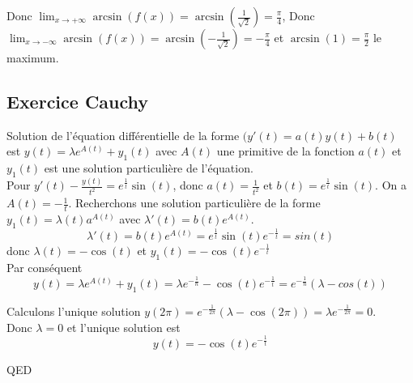 \documentclass[]{book}
\theoremstyle{definition}
\begin{document}
Donc $\lim_{x\to+\infty} \arcsin(f(x)) = \arcsin(\frac{1}{\sqrt{2}}) = \frac{\pi}{4}$, Donc $\lim_{x\to-\infty} \arcsin(f(x)) = \arcsin(-\frac{1}{\sqrt{2}}) = -\frac{\pi}{4}$ et $\arcsin(1) = \frac{\pi}{2}$ le maximum.


\newpage
\subsection*{Exercice Cauchy}
Solution de l'\'equation diff\'erentielle de la forme $(y'(t) = a(t)y(t) + b(t)$ est $y(t) = \lambda e^{A(t)}+y_1(t)$ avec $A(t)$ une primitive de la fonction $a(t)$ et $y_1(t)$ est une solution particuli\`ere de l'\'equation.\\

Pour $y'(t) - \frac{y(t)}{t^2} = e^{\frac{1}{t}}\sin(t)$, donc $a(t) = \frac{1}{t^2}$ et $b(t)= e^{\frac{1}{t}}\sin(t)$. On a $A(t) = -\frac{1}{t}$. Recherchons une  solution particuli\`ere de la forme $y_1(t) = \lambda(t)a^{A(t)}$ avec $\lambda'(t) = b(t)e^{A(t)}$.
$$\lambda'(t) = b(t)e^{A(t)} = e^{\frac{1}{t}}\sin(t)e^{-\frac{1}{t}} = sin(t)$$
donc $\lambda(t) =  -\cos(t)$ et $y_1(t) = -\cos(t)e^{-\frac{1}{t}}$\\
Par cons\'equent
$$y(t) = \lambda e^{A(t)}+y_1(t) = \lambda e^{-\frac{1}{n}} -\cos(t)e^{-\frac{1}{t}} = e^{-\frac{1}{n}}(\lambda-cos(t))$$

Calculons l'unique solution $y(2\pi) =  e^{-\frac{1}{2\pi}}(\lambda-\cos(2\pi)) = \lambda e^{-\frac{1}{2\pi}} = 0$.\\
Donc $\lambda = 0$ et l'unique solution est 
$$y(t) = -\cos(t)e^{-\frac{1}{t}}$$


QED
\end{document}
